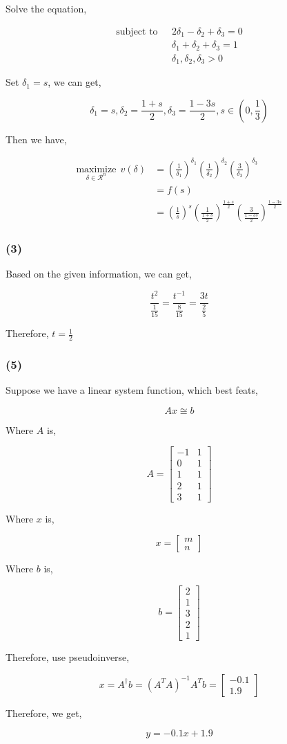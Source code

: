 \documentclass{article}
\begin{document}
Solve the equation, 

\[
\begin{split}
\text{subject to}\ \ \ & 2\delta_1 - \delta_2 + \delta_3 = 0 \\ 
& \delta_1 + \delta_2 + \delta_3 = 1 \\
& \delta_1, \delta_2, \delta_3 > 0
\end{split}
\]

Set $\delta_1 = s$, we can get,

$$\delta_1 = s, \delta_2 = \frac{1 + s}{2}, \delta_3 = \frac{1 - 3s}{2}, s\in (0, \frac{1}{3})$$

Then we have,

\[
\begin{split}
\underset{\delta \in \mathcal{R}^n}{\text{maximize}} \ \  v(\delta) &= \left(\frac{1}{\delta_1}\right)^{\delta_1}\left(\frac{1}{\delta_2}\right)^{\delta_2}\left(\frac{3}{\delta_3}\right)^{\delta_3} \\
& = f(s)\\ 
& = \left(\frac{1}{s}\right)^{s}\left(\frac{1}{\frac{1 + s}{2}}\right)^{\frac{1 + s}{2}}\left(\frac{3}{ \frac{1 - 3s}{2}}\right)^{ \frac{1 - 3s}{2}} 
\end{split}
\]


\subsubsection*{(3)}

Based on the given information, we can get,

$$\frac{t^2}{\frac{1}{15}} = \frac{t^{-1}}{\frac{8}{15}} = \frac{3t}{\frac{2}{5}}$$

Therefore, $t = \frac{1}{2}$

\subsubsection*{(5)}

Suppose we have a linear system function, which best feats,

$$Ax \cong b$$

Where $A$ is,

$$A =\begin{bmatrix} -1 & 1\\ 0 &1\\ 1&1\\ 2&1\\3&1 \end{bmatrix}$$

Where $x$ is,

$$x = \begin{bmatrix} m \\ n \end{bmatrix}$$


Where $b$ is,

$$b =\begin{bmatrix} 2 \\ 1 \\3\\2\\1 \end{bmatrix}$$

Therefore, use pseudoinverse,

$$x = A^{\dagger}b = (A^TA)^{-1}A^Tb = \begin{bmatrix} -0.1 \\ 1.9 \end{bmatrix}$$

Therefore, we get,

$$y = -0.1x + 1.9$$
\end{document}
